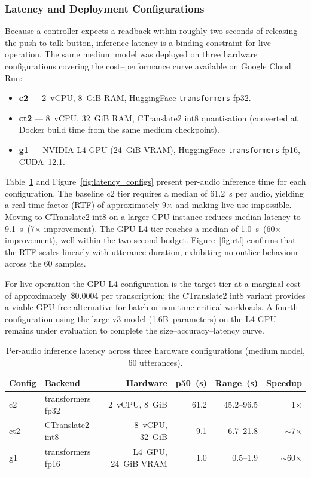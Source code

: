 \subsubsection{Latency and Deployment Configurations}

Because a controller expects a readback within roughly two seconds of releasing
the push-to-talk button, inference latency is a binding constraint for live
operation. The same medium model was deployed on three hardware configurations
covering the cost--performance curve available on Google Cloud Run:

\begin{itemize}
  \item \textbf{c2} — 2~vCPU, 8~GiB RAM, HuggingFace \texttt{transformers} fp32.
  \item \textbf{ct2} — 8~vCPU, 32~GiB RAM, CTranslate2 int8 quantisation
        (converted at Docker build time from the same medium checkpoint).
  \item \textbf{g1} — NVIDIA L4 GPU (24~GiB VRAM), HuggingFace
        \texttt{transformers} fp16, CUDA~12.1.
\end{itemize}

Table~\ref{tab:latency} and Figure~\ref{fig:latency_configs} present per-audio
inference time for each configuration. The baseline c2 tier requires a median of
61.2~s per audio, yielding a real-time factor (RTF) of approximately 9$\times$ and
making live use impossible. Moving to CTranslate2 int8 on a larger CPU instance
reduces median latency to 9.1~s~(7$\times$ improvement). The GPU L4 tier reaches a
median of 1.0~s~(60$\times$ improvement), well within the two-second budget.
Figure~\ref{fig:rtf} confirms that the RTF scales linearly with utterance
duration, exhibiting no outlier behaviour across the 60 samples.

For live operation the GPU L4 configuration is the target tier at a marginal cost
of approximately~\$0.0004 per transcription; the CTranslate2 int8 variant provides
a viable GPU-free alternative for batch or non-time-critical workloads. A fourth
configuration using the large-v3 model (1.6B~parameters) on the L4 GPU remains
under evaluation to complete the size--accuracy--latency curve.

\begin{table}[htbp]
\caption{Per-audio inference latency across three hardware configurations (medium model, 60 utterances).}
\label{tab:latency}
\centering
\begin{tabular}{llrrrr}
\toprule
Config & Backend & Hardware & p50~(s) & Range~(s) & Speedup \\
\midrule
c2  & transformers fp32 & 2~vCPU, 8~GiB  & 61.2 & 45.2--96.5 & 1$\times$ \\
ct2 & CTranslate2 int8   & 8~vCPU, 32~GiB & 9.1  & 6.7--21.8  & $\sim$7$\times$ \\
g1  & transformers fp16  & L4~GPU, 24~GiB VRAM & 1.0 & 0.5--1.9 & $\sim$60$\times$ \\
\bottomrule
\end{tabular}
\end{table}


